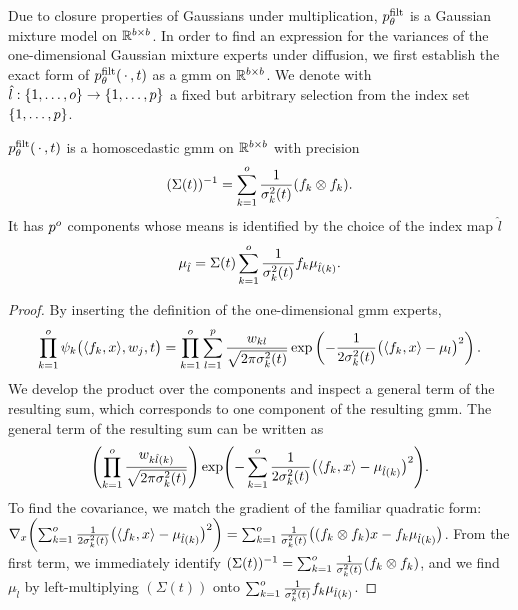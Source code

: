 Due to closure properties of Gaussians under multiplication, \( p^{\mathrm{filt}}_\theta \) is a Gaussian mixture model on \( \mathbb{R}^{b\times b} \).
In order to find an expression for the variances of the one-dimensional Gaussian mixture experts under diffusion, we first establish the exact form of \( p^{\mathrm{filt}}_\theta(\,\cdot\,, t) \) as a \gls{gmm} on \( \mathbb{R}^{b\times b} \).
We denote with \( \hat{l} : \{ 1, \dotsc, o \} \to \{ 1, \dotsc, p \}  \) a fixed but arbitrary selection from the index set \( \{ 1, \dotsc, p \} \).
\begin{theorem}
	\( p^{\mathrm{filt}}_\theta(\,\cdot\,, t) \) is a homoscedastic \gls{gmm} on \( \mathbb{R}^{b \times b} \) with precision
	\begin{equation}
		(\Sigma(t))^{-1} = \sum_{k=\num{1}}^o \frac{1}{\sigma_k^{\num{2}}(t)} (f_k \otimes f_k).
		\label{eq:precision}
	\end{equation}
	It has \( p^o \) components whose means is identified by the choice of the index map \( \hat{l} \)
	\begin{equation}
		\mu_{\hat{l}} = \Sigma(t) \sum_{k=\num{1}}^o \frac{1}{\sigma^{\num{2}}_k(t)}f_k \mu_{\hat{l}(k)}.
	\end{equation}%
	\label{th:gmm}
\end{theorem}
\begin{proof}
	By inserting the definition of the one-dimensional \gls{gmm} experts,
	\begin{equation}
		\prod_{k=\num{1}}^o \psi_k \bigl( \langle f_k, x \rangle, w_{j}, t \bigr) = \prod_{k=\num{1}}^o \sum_{l=\num{1}}^{p} \frac{w_{kl}}{\sqrt{\num{2}\pi\sigma_k^{\num{2}}(t)}} \exp\left(-\frac{1}{\num{2}\sigma_k^{\num{2}}(t)}{\bigl(\langle f_k, x \rangle - \mu_l\bigr)}^{\num{2}} \right).
	\end{equation}
	We develop the product over the components and inspect a general term of the resulting sum, which corresponds to one component of the resulting \gls{gmm}.
	The general term of the resulting sum can be written as
	\begin{equation}
		\Biggl( \prod_{k=\num{1}}^o \frac{w_{k\hat{l}(k)}}{\sqrt{\num{2}\pi\sigma_k^{\num{2}}(t)}} \Biggr) \exp\Biggl( -\sum_{k=\num{1}}^o \frac{1}{\num{2}\sigma_k^{\num{2}}(t)} \bigl(\langle f_k, x \rangle - \mu_{\hat{l}(k)}\bigr)^{\num{2}} \Biggr).
	\end{equation}
	To find the covariance, we match the gradient of the familiar quadratic form:
	\( \nabla_{x} \biggl(  \sum_{k=\num{1}}^o \frac{1}{\num{2}\sigma_k^{\num{2}}(t)} \bigl(\langle f_k, x \rangle - \mu_{\hat{l}(k)}\bigr)^{\num{2}} \biggr) = \sum_{k=\num{1}}^o \frac{1}{\sigma_k^{\num{2}}(t)} \bigl( (f_k \otimes f_k) x - f_k \mu_{\hat{l}(k)}\bigr) \).
	From the first term, we immediately identify \( (\Sigma(t))^{-1} = \sum_{k=\num{1}}^o \frac{1}{\sigma_k^{\num{2}}(t)} (f_k \otimes f_k) \), and we find \( \mu_{\hat{l}} \) by left-multiplying \( (\Sigma(t)) \) onto \( \sum_{k=\num{1}}^o \frac{1}{\sigma_k^{\num{2}}(t)} f_k \mu_{\hat{l}(k)} \).
\end{proof}

